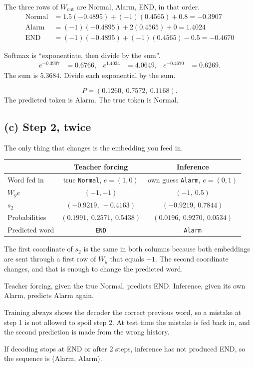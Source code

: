 \documentclass[11pt,a4paper]{article}
\newcommand{\tok}[1]{\texttt{#1}}
\begin{document}
The three rows of \(W_{\mathrm{out}}\) are Normal, Alarm, END, in that order.
\begin{align*}
\text{Normal}&= 1.5(-0.4895)+(-1)(0.4565)+0.8 = -0.3907\\
\text{Alarm}&= (-1)(-0.4895)+2(0.4565)+0 = 1.4024\\
\text{END}&= (-1)(-0.4895)+(-1)(0.4565)-0.5 = -0.4670
\end{align*}

Softmax is ``exponentiate, then divide by the sum''.
\begin{align*}
e^{-0.3907}&=0.6766, & e^{1.4024}&=4.0649, & e^{-0.4670}&=0.6269.
\end{align*}
The sum is \(5.3684\). Divide each exponential by the sum.

\begin{answer}[Q2(b)]
\[
P=(0.1260,\ 0.7572,\ 0.1168).
\]
The predicted token is Alarm. The true token is Normal.
\end{answer}

\subsection{(c) Step 2, twice}

The only thing that changes is the embedding you feed in.

\begin{center}
\begin{tabular}{lcc}
\toprule
 & Teacher forcing & Inference \\
\midrule
Word fed in & true \tok{Normal}, \(e=(1,0)\) & own guess \tok{Alarm}, \(e=(0,1)\) \\
\(W_y e\) & \((-1,-1)\) & \((-1,\ 0.5)\) \\
\(s_2\) & \((-0.9219,\ -0.4163)\) & \((-0.9219,\ 0.7844)\) \\
Probabilities & \((0.1991,\ 0.2571,\ 0.5438)\) & \((0.0196,\ 0.9270,\ 0.0534)\) \\
Predicted word & \tok{END} & \tok{Alarm} \\
\bottomrule
\end{tabular}
\end{center}

The first coordinate of \(s_2\) is the same in both columns because both embeddings are sent through a first row of \(W_y\) that equals \(-1\). The second coordinate changes, and that is enough to change the predicted word.

\begin{answer}[Q2(c)]
Teacher forcing, given the true Normal, predicts END. Inference, given its own Alarm, predicts Alarm again.

Training always shows the decoder the correct previous word, so a mistake at step 1 is not allowed to spoil step 2. At test time the mistake is fed back in, and the second prediction is made from the wrong history.

If decoding stops at END or after 2 steps, inference has not produced END, so the sequence is (Alarm, Alarm).
\end{answer}
\end{document}
